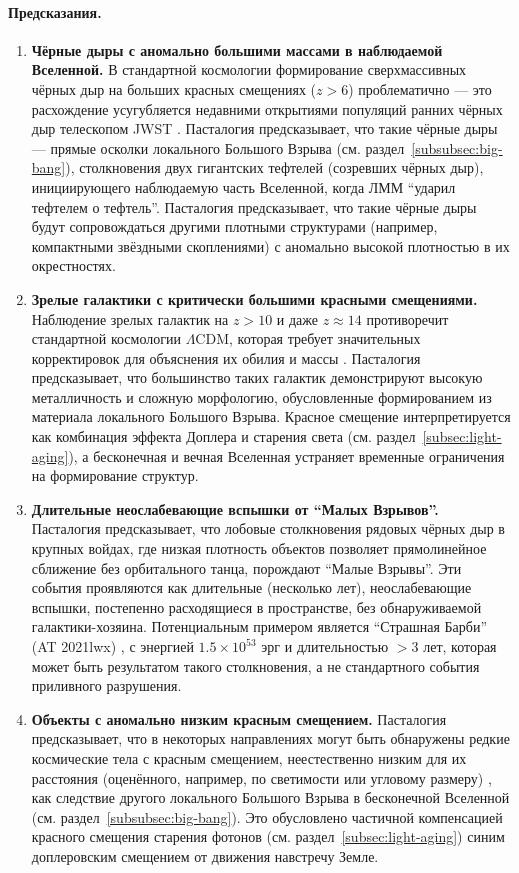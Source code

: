 \documentclass[pdflatex,sn-mathphys-num]{sn-jnl}
\begin{document}
\paragraph{Предсказания.}
\begin{enumerate}
    \item \textbf{Чёрные дыры с аномально большими массами в наблюдаемой Вселенной.} В стандартной космологии формирование сверхмассивных чёрных дыр на больших красных смещениях (\( z > 6 \)) проблематично \cite{larson2023-jwst-bh} --- это расхождение усугубляется недавними открытиями популяций ранних чёрных дыр телескопом JWST \cite{maiolino2024-jades-bh}. Пасталогия предсказывает, что такие чёрные дыры --- прямые осколки локального Большого Взрыва (см. раздел~\ref{subsubsec:big-bang}), столкновения двух гигантских тефтелей (созревших чёрных дыр), инициирующего наблюдаемую часть Вселенной, когда ЛММ ``ударил тефтелем о тефтель''. Пасталогия предсказывает, что такие чёрные дыры будут сопровождаться другими плотными структурами (например, компактными звёздными скоплениями) с аномально высокой плотностью в их окрестностях.
    \item \textbf{Зрелые галактики с критически большими красными смещениями.} Наблюдение зрелых галактик на \( z > 10 \) \cite{labbe2023-jwst-galaxies} и даже \( z \approx 14 \) \cite{carniani2024-z14} противоречит стандартной космологии \(\Lambda\)CDM, которая требует значительных корректировок для объяснения их обилия и массы \cite{lu2024-jwst-lcdm-tension}. Пасталогия предсказывает, что большинство таких галактик демонстрируют высокую металличность и сложную морфологию, обусловленные формированием из материала локального Большого Взрыва. Красное смещение интерпретируется как комбинация эффекта Доплера и старения света (см. раздел~\ref{subsec:light-aging}), а бесконечная и вечная Вселенная устраняет временные ограничения на формирование структур.
    \item \textbf{Длительные неослабевающие вспышки от ``Малых Взрывов''.} Пасталогия предсказывает, что лобовые столкновения рядовых чёрных дыр в крупных войдах, где низкая плотность объектов позволяет прямолинейное сближение без орбитального танца, порождают ``Малые Взрывы''. Эти события проявляются как длительные (несколько лет), неослабевающие вспышки, постепенно расходящиеся в пространстве, без обнаруживаемой галактики-хозяина. Потенциальным примером является ``Страшная Барби'' (AT 2021lwx) \cite{subrayan2023-barbie}, с энергией \( 1.5 × 10^{53} \) эрг и длительностью \( >3 \) лет, которая может быть результатом такого столкновения, а не стандартного события приливного разрушения.
    \item \textbf{Объекты с аномально низким красным смещением.} Пасталогия предсказывает, что в некоторых направлениях могут быть обнаружены редкие космические тела с красным смещением, неестественно низким для их расстояния (оценённого, например, по светимости или угловому размеру) \cite{arp1987-quasars}, как следствие другого локального Большого Взрыва в бесконечной Вселенной (см. раздел~\ref{subsubsec:big-bang}). Это обусловлено частичной компенсацией красного смещения старения фотонов (см. раздел~\ref{subsec:light-aging}) синим доплеровским смещением от движения навстречу Земле.
\end{enumerate}
 
\end{document}

